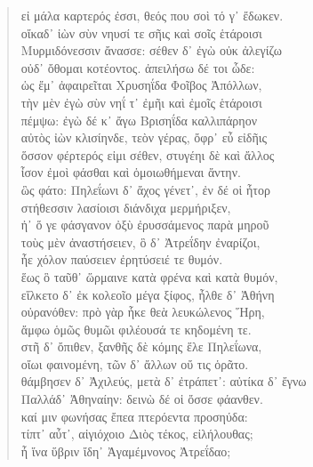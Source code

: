 \begin{Spacing}{1.5}
\begin{verse}
{\large\g εἰ μάλα καρτερός ἐσσι, θεός που σοὶ τό γ᾽ ἔδωκεν.  } \\
{\large\g οἴκαδ᾽ ἰὼν σὺν νηυσί τε σῆις καὶ σοῖς ἑτάροισι  } \\
{\large\g Μυρμιδόνεσσιν ἄνασσε: σέθεν δ᾽ ἐγὼ οὐκ ἀλεγίζω  } \\
{\large\g οὐδ᾽ ὄθομαι κοτέοντος. ἀπειλήσω δέ τοι ὧδε:  } \\
{\large\g ὡς ἔμ᾽ ἀφαιρεῖται Χρυσηΐδα Φοῖβος Ἀπόλλων,  } \\
{\large\g τὴν μὲν ἐγὼ σὺν νηΐ τ᾽ ἐμῆι καὶ ἐμοῖς ἑτάροισι  } \\
{\large\g πέμψω: ἐγὼ δέ κ᾽ ἄγω Βρισηΐδα καλλιπάρηον  } \\
{\large\g αὐτὸς ἰὼν κλισίηνδε, τεὸν γέρας, ὄφρ᾽ εὖ εἰδῆις  } \\
{\large\g ὅσσον φέρτερός εἰμι σέθεν, στυγέηι δὲ καὶ ἄλλος  } \\
{\large\g ἶσον ἐμοὶ φάσθαι καὶ ὁμοιωθήμεναι ἄντην.  } \\
{\large\g ὣς φάτο: Πηλεΐωνι δ᾽ ἄχος γένετ᾽, ἐν δέ οἱ ἦτορ  } \\
{\large\g στήθεσσιν λασίοισι διάνδιχα μερμήριξεν,  } \\
{\large\g ἠ᾽ ὅ γε φάσγανον ὀξὺ ἐρυσσάμενος παρὰ μηροῦ  } \\
{\large\g τοὺς μὲν ἀναστήσειεν, ὃ δ᾽ Ἀτρεΐδην ἐναρίζοι,  } \\
{\large\g ἦε χόλον παύσειεν ἐρητύσειέ τε θυμόν.  } \\
{\large\g ἕως ὃ ταῦθ᾽ ὥρμαινε κατὰ φρένα καὶ κατὰ θυμόν,  } \\
{\large\g εἵλκετο δ᾽ ἐκ κολεοῖο μέγα ξίφος, ἦλθε δ᾽ Ἀθήνη  } \\
{\large\g οὐρανόθεν: πρὸ γὰρ ἧκε θεὰ λευκώλενος Ἥρη,  } \\
{\large\g ἄμφω ὁμῶς θυμῶι φιλέουσά τε κηδομένη τε.  } \\
{\large\g στῆ δ᾽ ὄπιθεν, ξανθῆς δὲ κόμης ἕλε Πηλεΐωνα,  } \\
{\large\g οἴωι φαινομένη, τῶν δ᾽ ἄλλων οὔ τις ὁρᾶτο.  } \\
{\large\g θάμβησεν δ᾽ Ἀχιλεύς, μετὰ δ᾽ ἐτράπετ᾽: αὐτίκα δ᾽ ἔγνω  } \\
{\large\g Παλλάδ᾽ Ἀθηναίην: δεινὼ δέ οἱ ὄσσε φάανθεν.  } \\
{\large\g καί μιν φωνήσας ἔπεα πτερόεντα προσηύδα:  } \\
{\large\g τίπτ᾽ αὖτ᾽, αἰγιόχοιο Διὸς τέκος, εἰλήλουθας;  } \\
{\large\g ἦ ἵνα ὕβριν ἴδη᾽  Ἀγαμέμνονος Ἀτρεΐδαο;  } \\

\end{verse}
\end{Spacing}
